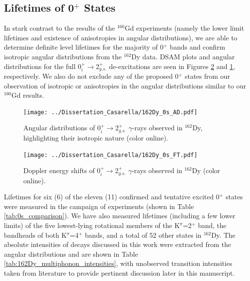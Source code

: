 \subsection{Lifetimes of 0$^+$ States}
In stark contrast to the results of the $^{160}$Gd experiments (namely the lower limit lifetimes and existence of anisotropies in angular distributions), we are able to determine definite level lifetimes for the majority of 0$^+$ bands and confirm isotropic angular distributions from the $^{162}$Dy data. DSAM plots and angular distributions for the full 0$^+_i\rightarrow$2$^+_{g.s.}$ de-excitations are seen in Figures \ref{fig:162Dy_0s_FT} and \ref{fig:162Dy_0s_AD}, respectively. We also do not exclude any of the proposed 0$^+$ states from our observation of isotropic or anisotropies in the angular distributions similar to our $^{160}$Gd results.

\begin{figure}[h!]
\begin{center}
\texttt{[image: ../Dissertation\_Casarella/162Dy\_0s\_AD.pdf]}
\caption{Angular distributions of 0$^+_i\rightarrow$2$^+_{g.s.}$ $\gamma$-rays observed in $^{162}$Dy, highlighting their isotropic nature (color online). \label{fig:162Dy_0s_AD}}
\end{center}
\end{figure}

\begin{figure}[h!]
\begin{center}
\texttt{[image: ../Dissertation\_Casarella/162Dy\_0s\_FT.pdf]}
\caption{Doppler energy shifts of 0$^+_i\rightarrow$2$^+_{g.s.}$ $\gamma$-rays observed in $^{162}$Dy (color online). \label{fig:162Dy_0s_FT}}
\end{center}
\end{figure}

Lifetimes for six (6) of the eleven (11) confirmed and tentative excited 0$^+$ states \cite{Meyer_pt0_2006} were measured in the campaign of experiments (shown in Table \ref{tab:0s_comparison}). We have also measured lifetimes (including a few lower limits) of the five lowest-lying rotational members of the K$^\pi$=2$^+$ band, the bandheads of both K$^\pi$=4$^+$ bands, and a total of 52 other states in $^{162}$Dy. The absolute intensities of decays discussed in this work were extracted from the angular distributions and are shown in Table \ref{tab:162Dy_multiphonon_intensities}, with unobserved transition intensities taken from literature \cite{Aprahamian200642,Zamfir_162Dy0_1999,Wu_2minus_2001} to provide pertinent discussion later in this manuscript.


